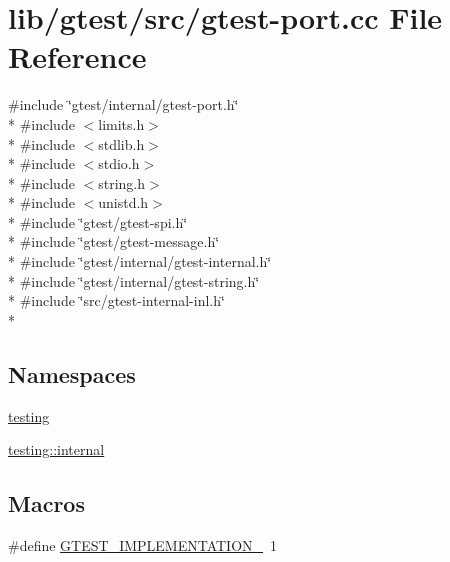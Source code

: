 \hypertarget{gtest-port_8cc}{\section{lib/gtest/src/gtest-\/port.cc File Reference}
\label{gtest-port_8cc}
}
{\ttfamily \#include \char`\"{}gtest/internal/gtest-\/port.\-h\char`\"{}}\\*
{\ttfamily \#include $<$limits.\-h$>$}\\*
{\ttfamily \#include $<$stdlib.\-h$>$}\\*
{\ttfamily \#include $<$stdio.\-h$>$}\\*
{\ttfamily \#include $<$string.\-h$>$}\\*
{\ttfamily \#include $<$unistd.\-h$>$}\\*
{\ttfamily \#include \char`\"{}gtest/gtest-\/spi.\-h\char`\"{}}\\*
{\ttfamily \#include \char`\"{}gtest/gtest-\/message.\-h\char`\"{}}\\*
{\ttfamily \#include \char`\"{}gtest/internal/gtest-\/internal.\-h\char`\"{}}\\*
{\ttfamily \#include \char`\"{}gtest/internal/gtest-\/string.\-h\char`\"{}}\\*
{\ttfamily \#include \char`\"{}src/gtest-\/internal-\/inl.\-h\char`\"{}}\\*
\subsection*{Namespaces}
\begin{DoxyCompactItemize}
\item 
\hyperlink{namespacetesting}{testing}
\item 
\hyperlink{namespacetesting_1_1internal}{testing\-::internal}
\end{DoxyCompactItemize}
\subsection*{Macros}
\begin{DoxyCompactItemize}
\item 
\#define \hyperlink{gtest-port_8cc_a83bd232fd1077579fada92c31bb7469f}{G\-T\-E\-S\-T\-\_\-\-I\-M\-P\-L\-E\-M\-E\-N\-T\-A\-T\-I\-O\-N\-\_\-}~1
\end{DoxyCompactItemize}
